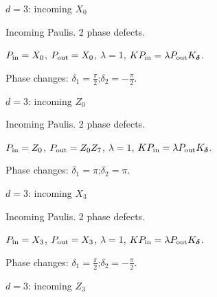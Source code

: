 {\Large $d=3$: incoming $X_{0}$}\par
Incoming Paulis. 2 phase defects.
\begin{center}
\end{center}
\vspace{-1mm}
$P_{\rm in}=X_{0}$, \quad $P_{\rm out}=X_{0}$, \quad $\lambda=1$, \qquad $K P_{\rm in}=\lambda P_{\rm out}K_{\boldsymbol\delta}$.
\par\smallskip\begin{minipage}{.98\linewidth}\small Phase changes: $\delta_{1}=\frac{\pi}{2}$;\quad $\delta_{2}=-\frac{\pi}{2}$.\end{minipage}
\vfill
{\footnotesize\texttt{}}
\newpage
{}
{\Large $d=3$: incoming $Z_{0}$}\par
Incoming Paulis. 2 phase defects.
\begin{center}
\end{center}
\vspace{-1mm}
$P_{\rm in}=Z_{0}$, \quad $P_{\rm out}=Z_{0}Z_{7}$, \quad $\lambda=1$, \qquad $K P_{\rm in}=\lambda P_{\rm out}K_{\boldsymbol\delta}$.
\par\smallskip\begin{minipage}{.98\linewidth}\small Phase changes: $\delta_{1}=\pi$;\quad $\delta_{2}=\pi$.\end{minipage}
\vfill
{\footnotesize\texttt{}}
\newpage
{}
{\Large $d=3$: incoming $X_{3}$}\par
Incoming Paulis. 2 phase defects.
\begin{center}
\end{center}
\vspace{-1mm}
$P_{\rm in}=X_{3}$, \quad $P_{\rm out}=X_{3}$, \quad $\lambda=1$, \qquad $K P_{\rm in}=\lambda P_{\rm out}K_{\boldsymbol\delta}$.
\par\smallskip\begin{minipage}{.98\linewidth}\small Phase changes: $\delta_{1}=\frac{\pi}{2}$;\quad $\delta_{2}=-\frac{\pi}{2}$.\end{minipage}
\vfill
{\footnotesize\texttt{}}
\newpage
{}
{\Large $d=3$: incoming $Z_{3}$}\par
